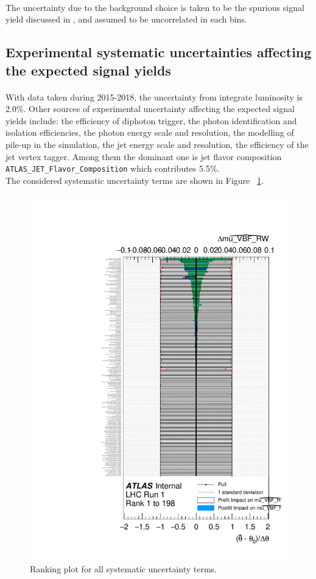 \paragraph{} The uncertainty due to the background choice is taken to be the spurious signal yield discussed in \Sect{\ref{ssec:spurious_signal}}, and assumed to be uncorrelated in each bins. 


\subsection{Experimental systematic uncertainties affecting the expected signal yields}
\label{ssec:expuncert}
\paragraph{} With data taken during 2015-2018, the uncertainty from integrate luminosity is 2.0\%. Other sources of experimental uncertainty affecting the expected signal yields include: the efficiency of diphoton trigger, the photon identification and isolation efficiencies, the photon energy scale and resolution, the modelling of pile-up in the simulation, the jet energy scale and resolution, the efficiency of the jet vertex tagger. Among them the dominant one is jet flavor composition \texttt{ATLAS\_JET\_Flavor\_Composition} which contributes 5.5\%. \\

The considered systematic uncertainty terms are shown in Figure ~\ref{fig:syst_ranking}. 

\begin{figure}[h]
  \centering
  \includegraphics[width=.9\textwidth]{figure/ranking.pdf}
  \caption{Ranking plot for all systematic uncertainty terms. }
  \label{fig:syst_ranking}
\end{figure}


